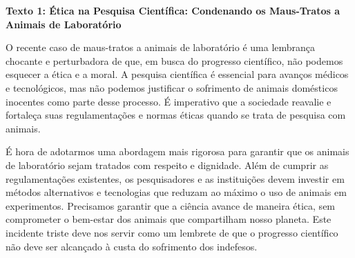 \begin{myquote}

\textbf{Texto 1: Ética na Pesquisa Científica: Condenando os Maus-Tratos a Animais de Laboratório}

O recente caso de maus-tratos a animais de laboratório é uma lembrança
chocante e perturbadora de que, em busca do progresso científico, não podemos
esquecer a ética e a moral. A pesquisa científica é essencial para avanços
médicos e tecnológicos, mas não podemos justificar o sofrimento de animais
domésticos inocentes como parte desse processo. É imperativo que a sociedade
reavalie e fortaleça suas regulamentações e normas éticas quando se trata de
pesquisa com animais.

É hora de adotarmos uma abordagem mais rigorosa para garantir que os animais
de laboratório sejam tratados com respeito e dignidade. Além de cumprir as
regulamentações existentes, os pesquisadores e as instituições devem investir
em métodos alternativos e tecnologias que reduzam ao máximo o uso de animais
em experimentos. Precisamos garantir que a ciência avance de maneira ética,
sem comprometer o bem-estar dos animais que compartilham nosso planeta. Este
incidente triste deve nos servir como um lembrete de que o progresso
científico não deve ser alcançado à custa do sofrimento dos indefesos.





\end{myquote}

